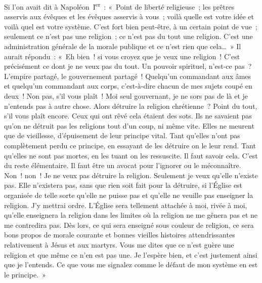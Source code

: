 \documentclass[french,twoside]{book} %
\begin{document}
Si l’on avait dit à Napoléon I\textsuperscript{er} : « Point de liberté religieuse ; les prêtres asservis aux évêques et les évêques asservis à vous ; voilà quelle est votre idée et voilà quel est votre système. C’est fort bien peut-être, à un certain point de vue ; seulement ce n’est pas une religion ; ce n’est pas du tout une religion. C’est une administration  générale de la morale publique et ce n’est rien que cela… » Il aurait répondu : « Eh bien ! si vous croyez que je veux une religion ! C’est précisément ce dont je ne veux pas du tout. Un pouvoir spirituel, n’est-ce pas ? L’empire partagé, le gouvernement partagé ! Quelqu’un commandant aux âmes et quelqu’un commandant aux corps, c’est-à-dire chacun de mes sujets coupé en deux ! Non pas, s’il vous plaît ! Moi seul gouvernant, je ne sors pas de là et je n’entends pas à autre chose. Alors détruire la religion chrétienne ? Point du tout, s’il vous plaît encore. Ceux qui ont rêvé cela étaient des sots. Ils ne savaient pas qu’on ne détruit pas les religions tout d’un coup, ni même vite. Elles ne meurent que de vieillesse, d’épuisement de leur principe vital. Tant qu’elles n’ont pas complètement perdu ce principe, en essayant de les détruire on le leur rend. Tant qu’elles ne sont pas mortes, en les tuant on les ressuscite. Il faut savoir cela. C’est du reste élémentaire. Il faut être un avocat pour l’ignorer ou le méconnaître. Non ! non ! Je ne veux pas détruire la religion. Seulement je veux qu’elle n’existe pas. Elle n’existera pas, sans que rien soit fait pour la détruire, si l’Église est organisée de telle sorte qu’elle ne puisse pas et qu’elle ne veuille pas enseigner la religion. J’y mettrai ordre. L’Église sera tellement attachée à  moi, rivée à moi, qu’elle enseignera la religion dans les limites où la religion ne me gênera pas et ne me contredira pas. Dès lors, ce qui sera enseigné sous couleur de religion, ce sera bons propos de morale courante et bonnes vieilles histoires attendrissantes relativement à Jésus et aux martyrs. Vous me dites que ce n’est guère une religion et que même ce n’en est pas une. Je l’espère bien, et c’est justement ainsi que je l’entends. Ce que vous me signalez comme le défaut de mon système en est le principe. »\par
\end{document}
